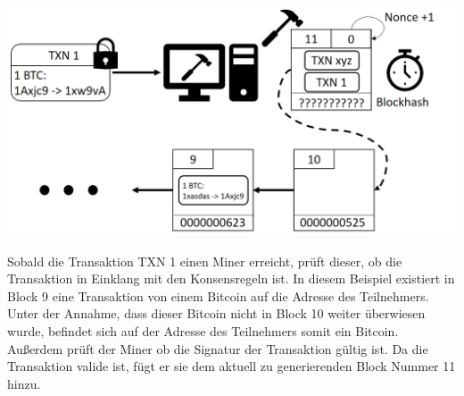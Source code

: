 \vspace{1cm}
\begin{minipage}{0.55\textwidth}
\includegraphics[width=\textwidth]{Figures/konzept_btc/konzept4}
\centering
\decoRule
{}
\label{fig:konzept4}
\end{minipage}
\begin{minipage}{0.45\textwidth}
Sobald die Transaktion TXN 1 einen Miner erreicht, prüft dieser, ob die Transaktion in Einklang mit den Konsensregeln ist. In diesem Beispiel existiert in Block 9 eine Transaktion von einem Bitcoin auf die Adresse des Teilnehmers. Unter der Annahme, dass dieser Bitcoin nicht in Block 10 weiter überwiesen wurde, befindet sich auf der Adresse des Teilnehmers somit ein Bitcoin. Außerdem prüft der Miner ob die Signatur der Transaktion gültig ist. Da die Transaktion valide ist, fügt er sie dem aktuell zu generierenden Block Nummer 11 hinzu. 
\end{minipage}


